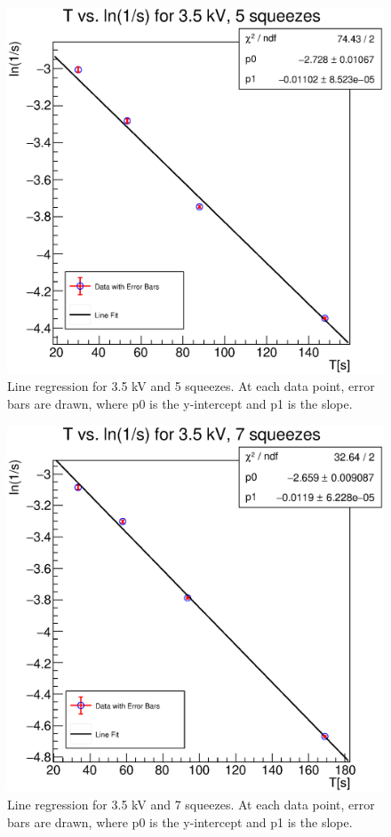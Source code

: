 \documentclass[reprint,amsmath,aps,nofootinbib,english]{revtex4-2}
\begin{document}
\begin{figure}[H]
  \includegraphics[width=0.95\columnwidth]{graphics/35_5.eps}
  \caption{Line regression for 3.5 kV and 5 squeezes. At each data point, error bars are drawn, where p0 is the y-intercept and p1 is the slope.}
\end{figure}




\begin{figure}[H]
  \includegraphics[width=0.95\columnwidth]{graphics/35_7.eps}
  \caption{Line regression for 3.5 kV and 7 squeezes. At each data point, error bars are drawn, where p0 is the y-intercept and p1 is the slope.}
\end{figure}
\end{document}
